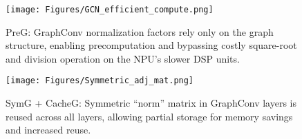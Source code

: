 
\begin{figure}[t!]
\begin{center}
\texttt{[image: Figures/GCN\_efficient\_compute.png]}%
\end{center}
\caption{PreG: GraphConv normalization factors rely only on the graph structure, enabling precomputation and bypassing costly square-root and division operation on the NPU's slower DSP units.}\label{fig:PreG}
\end{figure}



\begin{figure}[t!]
\begin{center}
\texttt{[image: Figures/Symmetric\_adj\_mat.png]}%
\end{center}
\caption{SymG + CacheG: Symmetric “norm” matrix in GraphConv layers is reused across all layers, allowing partial storage for memory savings and increased reuse.}\label{fig:SymG_CacheG}
\end{figure}

